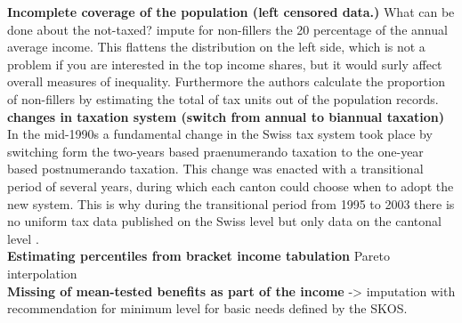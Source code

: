 \documentclass[twoside]{article}\usepackage[]{graphicx}\usepackage[]{color}
\begin{document}
\begin{multicols}{2}




\textbf{Incomplete coverage of the population (left censored data.)} What can be done about the not-taxed? \citet{dell_income_2007} impute for non-fillers the 20 percentage of the annual average income. This flattens the distribution on the left side, which is not a problem if you are interested in the top income shares, but it would surly affect overall measures of inequality. Furthermore the authors calculate the proportion of non-fillers by estimating the total of tax units out of the population records. \\

\textbf{changes in taxation system  (switch from annual to biannual taxation)} In the mid-1990s a fundamental change in the Swiss tax system took place by switching form the two-years based praenumerando taxation to the one-year based postnumerando taxation. This change was enacted with a transitional period of several years, during which each canton could choose when to adopt the new system.  This is why during the transitional period from 1995 to 2003 there is no uniform tax data published on the Swiss level but only data on the cantonal level \citep[8f]{foellmi_volatile_2013}. \\

\textbf{Estimating percentiles from bracket income tabulation} Pareto interpolation \\ 

\textbf{Missing of mean-tested benefits as part of the income} -> imputation with recommendation for minimum level for basic needs defined by the SKOS.\\


\end{multicols}
\end{document}
